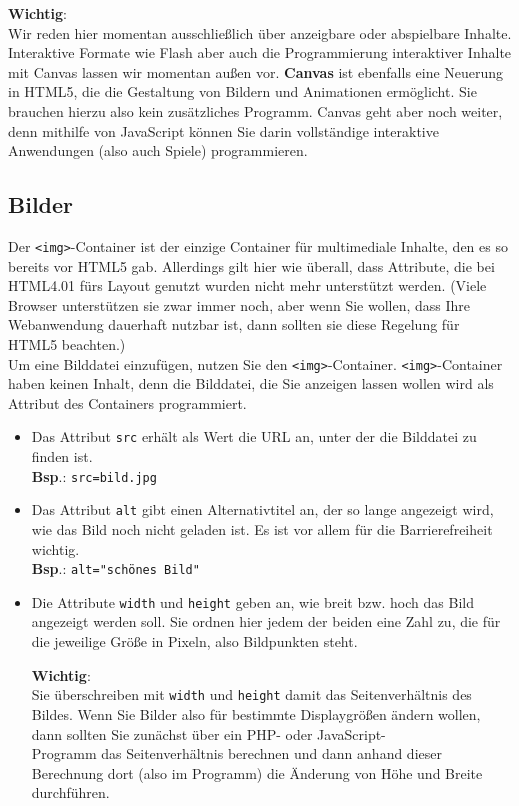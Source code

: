 \textbf{Wichtig}:\\

Wir reden hier momentan ausschließlich über anzeigbare oder abspielbare Inhalte. Interaktive Formate wie Flash aber auch die Programmierung interaktiver Inhalte mit Canvas lassen wir momentan außen vor. \textbf{Canvas} ist ebenfalls eine Neuerung in HTML5, die die Gestaltung von Bildern und Animationen ermöglicht. Sie brauchen hierzu also kein zusätzliches Programm. Canvas geht aber noch weiter, denn mithilfe von JavaScript können Sie darin vollständige interaktive Anwendungen (also auch Spiele) programmieren.

\subsection{Bilder}

Der \verb|<img>|-Container ist der einzige Container für multimediale Inhalte, den es so bereits vor HTML5 gab. Allerdings gilt hier wie überall, dass Attribute, die bei HTML4.01 fürs Layout genutzt wurden nicht mehr unterstützt werden. (Viele Browser unterstützen sie zwar immer noch, aber wenn Sie wollen, dass Ihre Webanwendung dauerhaft nutzbar ist, dann sollten sie diese Regelung für HTML5 beachten.)\\

Um eine Bilddatei einzufügen, nutzen Sie den \verb|<img>|-Container. \verb|<img>|-Container haben keinen Inhalt, denn die Bilddatei, die Sie anzeigen lassen wollen wird als Attribut des Containers programmiert.\\

\begin{itemize}
	\item Das Attribut \verb|src| erhält als Wert die URL an, unter der die Bilddatei zu finden ist.\\	
	\textbf{Bsp}.: \verb|src=bild.jpg|

	\item Das Attribut \verb|alt| gibt einen Alternativtitel an, der so lange angezeigt wird, wie das Bild noch nicht geladen ist. Es ist vor allem für die Barrierefreiheit wichtig.\\	
	\textbf{Bsp}.: \verb|alt="schönes Bild"|

	\item Die Attribute \verb|width| und \verb|height| geben an, wie breit bzw. hoch das Bild angezeigt werden soll. Sie ordnen hier jedem der beiden eine Zahl zu, die für die jeweilige Größe in Pixeln, also Bildpunkten steht. 

	\textbf{Wichtig}:\\	
	Sie überschreiben mit \verb|width| und \verb|height| damit das Seitenverhältnis des Bildes. Wenn Sie Bilder also für bestimmte Displaygrößen ändern wollen, dann sollten Sie zunächst über ein PHP- oder JavaScript-\\Programm das Seitenverhältnis berechnen und dann anhand dieser Berechnung dort (also im Programm) die Änderung von Höhe und Breite durchführen.
\end{itemize}

